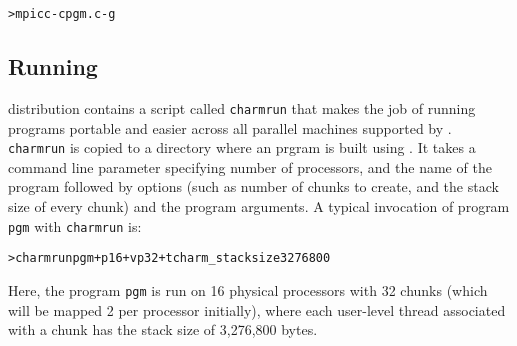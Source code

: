 \documentclass[10pt]{article}
\begin{document}
\begin{alltt}
> mpicc -c pgm.c -g
\end{alltt}

\subsection{Running}
\charmpp{} distribution contains a script called \texttt{charmrun} that makes
the job of running \ampi{} programs portable and easier across all parallel
machines supported by \charmpp{}. \texttt{charmrun} is copied to a directory
where an \ampi{} prgram is built using \charmc{}. It takes a command line
parameter specifying number of processors, and the name of the program followed
by \ampi{} options (such as number of chunks to create, and the stack size of
every chunk) and the program arguments. A typical invocation of \ampi{} program
\texttt{pgm} with \texttt{charmrun} is:

\begin{alltt}
> charmrun pgm +p16 +vp32 +tcharm_stacksize 3276800
\end{alltt}

Here, the \ampi{} program \texttt{pgm} is run on 16 physical processors with
32 chunks (which will be mapped 2 per processor initially), where each
user-level thread associated with a chunk has the stack size of 3,276,800 bytes.
\end{document}
